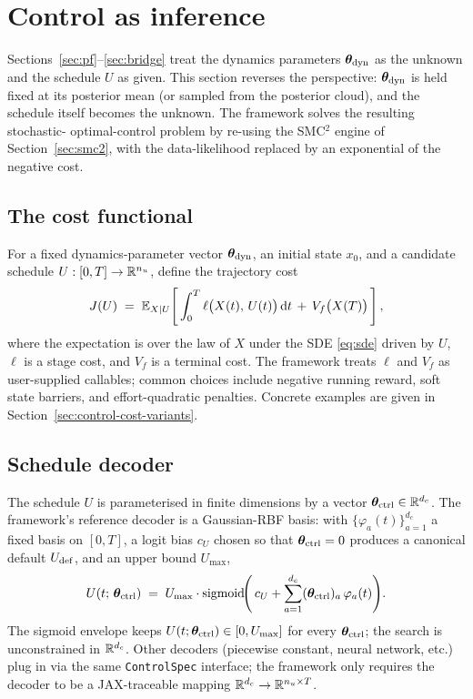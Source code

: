 \section{Control as inference} \label{sec:control}

Sections~\ref{sec:pf}--\ref{sec:bridge} treat the dynamics parameters
$\bm{\theta}_{\rm dyn}$ as the unknown and the schedule $U$ as given. This section
reverses the perspective: $\bm{\theta}_{\rm dyn}$ is held fixed at its posterior
mean (or sampled from the posterior cloud), and the schedule itself
becomes the unknown. The framework solves the resulting stochastic-
optimal-control problem by re-using the SMC$^2$ engine of
Section~\ref{sec:smc2}, with the data-likelihood replaced by an
exponential of the negative cost.

\subsection{The cost functional}

For a fixed dynamics-parameter vector $\bm{\theta}_{\rm dyn}$, an initial state
$x_0$, and a candidate schedule $U: [0, T] \to \mathbb{R}^{n_u}$, define the
trajectory cost
\begin{equation}
J(U) \;=\; \mathbb{E}_{X \mid U}\!\left[\,
   \int_0^T \ell\bigl(X(t),\, U(t)\bigr)\, \mathrm{d} t
   \,+\, V_f\bigl(X(T)\bigr)\,\right],
\label{eq:cost}
\end{equation}
where the expectation is over the law of $X$ under the SDE
\eqref{eq:sde} driven by $U$, $\ell$ is a stage cost, and $V_f$ is a
terminal cost. The framework treats $\ell$ and $V_f$ as user-supplied
callables; common choices include negative running reward, soft state
barriers, and effort-quadratic penalties. Concrete examples are given
in Section~\ref{sec:control-cost-variants}.

\subsection{Schedule decoder}

The schedule $U$ is parameterised in finite dimensions by a vector
$\bm{\theta}_{\rm ctrl} \in \mathbb{R}^{d_c}$. The framework's reference decoder is a
Gaussian-RBF basis: with $\{\varphi_a(t)\}_{a=1}^{d_c}$ a fixed basis
on $[0, T]$, a logit bias $c_U$ chosen so that $\bm{\theta}_{\rm ctrl} = 0$
produces a canonical default $U_{\rm def}$, and an upper bound
$U_{\max}$,
\begin{equation}
U(t;\,\bm{\theta}_{\rm ctrl}) \;=\;
   U_{\max} \cdot \mathrm{sigmoid}\!\Biggl(\,c_U
      + \sum_{a=1}^{d_c} (\bm{\theta}_{\rm ctrl})_a\,\varphi_a(t)\Biggr).
\label{eq:schedule-decoder}
\end{equation}
The sigmoid envelope keeps $U(t; \bm{\theta}_{\rm ctrl}) \in [0, U_{\max}]$ for
every $\bm{\theta}_{\rm ctrl}$; the search is unconstrained in $\mathbb{R}^{d_c}$. Other
decoders (piecewise constant, neural network, etc.) plug in via the
same \texttt{ControlSpec} interface; the framework only requires the
decoder to be a JAX-traceable mapping
$\mathbb{R}^{d_c} \to \mathbb{R}^{n_u \times T}$.


